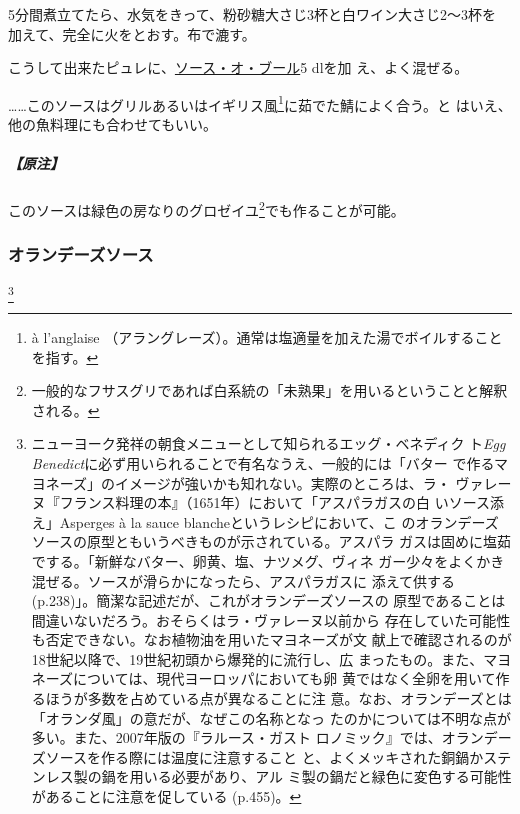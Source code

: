\begin{recette}
5分間煮立てたら、水気をきって、粉砂糖大さじ3杯と白ワイン大さじ2〜3杯を
加えて、完全に火をとおす。布で漉す。

こうして出来たピュレに、\protect\hyperlink{sauce-au-beurre}{ソース・オ・ブール}5
dlを加 え、よく混ぜる。

\ldots{}\ldots{}このソースはグリルあるいはイギリス風\footnote{à
  l'anglaise
  （アラングレーズ）。通常は塩適量を加えた湯でボイルすることを指す。}に茹でた鯖によく合う。と
はいえ、他の魚料理にも合わせてもいい。

\hypertarget{ux539fux6ce8-4}{%
\subparagraph{【原注】}\label{ux539fux6ce8-4}}

このソースは緑色の房なりのグロゼイユ\footnote{一般的なフサスグリであれば白系統の「未熟果」を用いるということと解釈される。}でも作ることが可能。

\maeaki

\hypertarget{sauce-hollandaise}{%
\subsubsection{オランデーズソース}\label{sauce-hollandaise}}

\footnote{ニューヨーク発祥の朝食メニューとして知られるエッグ・ベネディク
  ト\emph{Egg
  Benedict}に必ず用いられることで有名なうえ、一般的には「バター
  で作るマヨネーズ」のイメージが強いかも知れない。実際のところは、ラ・
  ヴァレーヌ『フランス料理の本』（1651年）において「アスパラガスの白
  いソース添え」Asperges à la sauce blancheというレシピにおいて、こ
  のオランデーズソースの原型ともいうべきものが示されている。アスパラ
  ガスは固めに塩茹でする。「新鮮なバター、卵黄、塩、ナツメグ、ヴィネ
  ガー少々をよくかき混ぜる。ソースが滑らかになったら、アスパラガスに
  添えて供する(p.238)」。簡潔な記述だが、これがオランデーズソースの
  原型であることは間違いないだろう。おそらくはラ・ヴァレーヌ以前から
  存在していた可能性も否定できない。なお植物油を用いたマヨネーズが文
  献上で確認されるのが18世紀以降で、19世紀初頭から爆発的に流行し、広
  まったもの。また、マヨネーズについては、現代ヨーロッパにおいても卵
  黄ではなく全卵を用いて作るほうが多数を占めている点が異なることに注
  意。なお、オランデーズとは「オランダ風」の意だが、なぜこの名称となっ
  たのかについては不明な点が多い。また、2007年版の『ラルース・ガスト
  ロノミック』では、オランデーズソースを作る際には温度に注意すること
  と、よくメッキされた銅鍋かステンレス製の鍋を用いる必要があり、アル
  ミ製の鍋だと緑色に変色する可能性があることに注意を促している (p.455)。}



\end{recette}
